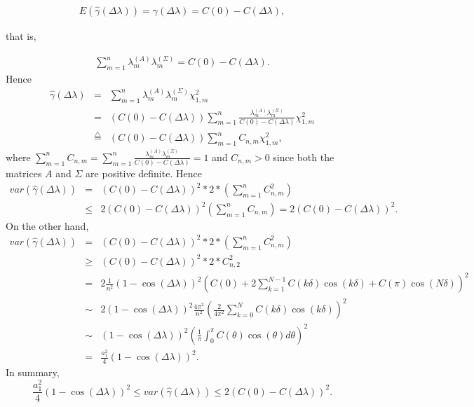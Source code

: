 \begin{eqnarray*}
E(\hat{\gamma}(\Delta \lambda)) = \gamma(\Delta \lambda) = C(0) - C(\Delta \lambda),
\end{eqnarray*}

that is,

\begin{eqnarray*}
\sum_{m = 1}^n \lambda_m^{(A)} \lambda_m^{(\Sigma)} = C(0) - C(\Delta \lambda).
\end{eqnarray*}
Hence
\begin{eqnarray*}
\hat{\gamma}(\Delta \lambda) &=& \sum_{m = 1}^n \lambda_m^{(A)} \lambda_m^{(\Sigma)} \chi_{1,m}^2  \\
&=& (C(0) - C(\Delta \lambda)) \sum_{m = 1}^n \frac{\lambda_m^{(A)} \lambda_m^{(\Sigma)}}{C(0) - C(\Delta \lambda)} \chi_{1,m}^2  \\
&\overset{\bigtriangleup}{=}&  (C(0) - C(\Delta \lambda)) \sum_{m = 1}^n C_{n,m} \chi_{1,m}^2,
\end{eqnarray*}
where $\sum_{m=1}^n C_{n, m} = \sum_{m=1}^n \frac{\lambda_m^{(A)} \lambda_m^{(\Sigma)}}{C(0) - C(\Delta \lambda)} = 1$ and $C_{n, m} > 0$ since both the matrices $A$ and $\Sigma$ are positive definite. Hence
\begin{eqnarray*}
var(\hat{\gamma}(\Delta \lambda)) &=& (C(0) - C(\Delta \lambda))^2 * 2 * \left(\sum_{m = 1}^n C_{n,m}^2\right) \\
&\le& 2(C(0) - C(\Delta \lambda))^2\left(\sum_{m = 1}^n C_{n,m}\right) = 2(C(0) - C(\Delta \lambda))^2.
\end{eqnarray*}
On the other hand,
\begin{eqnarray*}
var(\hat{\gamma}(\Delta \lambda)) &=& (C(0) - C(\Delta \lambda))^2 * 2 * \left(\sum_{m = 1}^n C_{n,m}^2\right) \\
&\ge& (C(0) - C(\Delta \lambda))^2 * 2 * C_{n, 2}^2 \\
&=& 2 \frac{1}{n^2}(1 - \cos(\Delta \lambda))^2\left(C(0) + 2\sum_{k = 1}^{N-1}C(k\delta)\cos(k\delta) + C(\pi)\cos(N\delta)\right)^2 \\
& \sim & 2 (1 - \cos(\Delta \lambda))^2 \frac{4\pi^2}{n^2} \left( \frac{2}{4\pi^2}\sum_{k=0}^N C(k\delta)\cos(k\delta)\right)^2 \\
&\sim & (1 - \cos(\Delta \lambda))^2 \left(\frac{1}{\pi}\int_0^\pi C(\theta)\cos(\theta)d\theta\right)^2 \\
&=& \frac{a_1^2}{4}(1 - \cos(\Delta \lambda))^2.
\end{eqnarray*}
In summary,
\[
\frac{a_1^2}{4} (1 - \cos(\Delta \lambda))^2  \le var(\hat{\gamma}(\Delta \lambda)) \le 2(C(0) - C(\Delta\lambda))^2.
\]

